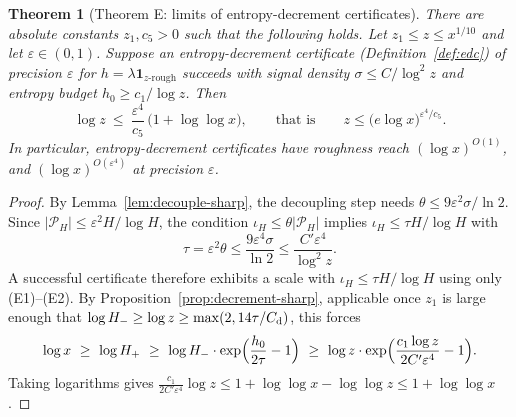 \documentclass[11pt]{amsart}
\newtheorem{theorem}{Theorem}[section]
\theoremstyle{definition}
\theoremstyle{remark}
\begin{document}
\begin{theorem}[Theorem E: limits of entropy-decrement certificates]\label{thm:entropy}
There are absolute constants $z_1,c_5>0$ such that the following holds. Let $z_1\le z\le x^{1/10}$ and let $\varepsilon\in(0,1)$. Suppose an entropy-decrement certificate (Definition~\ref{def:edc}) of precision $\varepsilon$ for $h=\lambda\mathbf 1_{z\text{-rough}}$ succeeds with signal density $\sigma\le C/\log^2z$ and entropy budget $h_0\ge c_1/\log z$. Then
\[
\log z\ \le\ \frac{\varepsilon^4}{c_5}\,\bigl(1+\log\log x\bigr),\qquad\text{that is}\qquad z\le\bigl(e\log x\bigr)^{\varepsilon^4/c_5}.
\]
In particular, entropy-decrement certificates have roughness reach $(\log x)^{O(1)}$, and $(\log x)^{O(\varepsilon^4)}$ at precision $\varepsilon$.
\end{theorem}
\begin{proof}
By Lemma~\ref{lem:decouple-sharp}, the decoupling step needs $\theta\le9\varepsilon^2\sigma/\ln2$. Since $|\mathcal P_H|\le\varepsilon^2H/\log H$, the condition $\iota_H\le\theta|\mathcal P_H|$ implies $\iota_H\le\tau H/\log H$ with
\[
\tau=\varepsilon^2\theta\le\frac{9\varepsilon^4\sigma}{\ln2}\le\frac{C'\varepsilon^4}{\log^2z}.
\]
A successful certificate therefore exhibits a scale with $\iota_H\le\tau H/\log H$ using only (E1)--(E2). By Proposition~\ref{prop:decrement-sharp}, applicable once $z_1$ is large enough that $\log H_-\ge\log z\ge\max(2,14\tau/C_{\rm d})$, this forces
\[
\log x\ \ge\ \log H_+\ \ge\ \log H_-\cdot\exp\Bigl(\frac{h_0}{2\tau}-1\Bigr)\ \ge\ \log z\cdot\exp\Bigl(\frac{c_1\log z}{2C'\varepsilon^4}-1\Bigr).
\]
Taking logarithms gives $\frac{c_1}{2C'\varepsilon^4}\log z\le1+\log\log x-\log\log z\le1+\log\log x$.
\end{proof}
\end{document}

